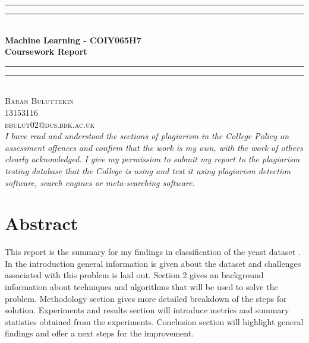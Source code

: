 \documentclass[12pt]{article}
\begin{document}
\begin{titlepage}
    \begin{center}
        \vspace*{.06\textheight}{\scshape\LARGE Birkbeck, University of London\par}\vspace{1.5cm} %
        \rule[0.5ex]{\linewidth}{2pt}\vspace*{-\baselineskip}\vspace*{3.2pt}
        \rule[0.5ex]{\linewidth}{1pt}\\[\baselineskip]
        \huge{\bfseries Machine Learning - COIY065H7\\Coursework Report}\\[4mm]
        \rule[0.5ex]{\linewidth}{1pt}\vspace*{-\baselineskip}\vspace{3.2pt}
        \rule[0.5ex]{\linewidth}{2pt}\\
        [2.5cm]
    
        \textsc{\Large Baran Buluttekin\\13153116\\bbulut02@dcs.bbk.ac.uk}\\
        [1.5cm]
        \large \textit{ I have read and understood the sections of plagiarism in the College Policy on assessment offences and confirm that the work is my own, with the work of others clearly acknowledged. I give my permission to submit my report to the plagiarism testing database that the College is using and test it using plagiarism detection software, search engines or meta-searching software.}


    \end{center}
    \cleardoublepage
\end{titlepage}   


\section*{Abstract}

This report is the summary for my findings in classification of the yeast dataset \cite{data}. In the introduction general information is given about the dataset and challenges associated with this problem is laid out. Section 2 gives an background information about techniques and algorithms that will be used to solve the problem. Methodology section gives more detailed breakdown of the steps for solution. Experiments and results section will introduce metrics and summary statistics obtained from the experiments. Conclusion section will highlight general findings and offer a next steps for the improvement. 
\end{document}
